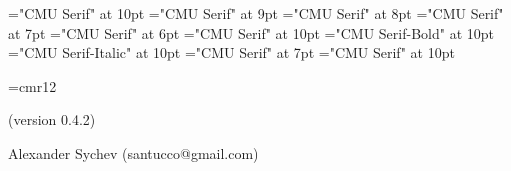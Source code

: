 \def\ver{0.4.2}
\font\tenrm="CMU Serif" at 10pt \tenrm
\font\ninerm="CMU Serif" at 9pt \ninerm
\font\eightrm="CMU Serif" at 8pt \eightrm 
\font\sevenrm="CMU Serif" at 7pt \sevenrm
\font\sixrm="CMU Serif" at 6pt \sixrm
\font\tentex="CMU Serif" at 10pt \tentex
\font\tenbf="CMU Serif-Bold" at 10pt \tenbf 
\font\tenit="CMU Serif-Italic" at 10pt \tenit 
\font\titlefont="CMU Serif" at 7pt   \titlefont 
\font\ttitlefont="CMU Serif" at 10pt  \ttitlefont

\def\As{\note{Также смотри секции}} %
\def\U{\note{Используется в секции}} %
\def\Us{\note{Используется в секциях}} %
\def\A{\note{Также смотри секцию}} %
\def\ET{ и~} %
\def\ETs{, и~} %
\def\fin{\par\vfill\eject %
  \ifpagesaved\null\vfill\eject\fi %
  \if L\lr\else\null\vfill\eject\fi %
  \parfillskip 0pt plus 1fil
  \def\grouptitle{НАЗВАНИЯ СЕКЦИЙ}
  \let\topsecno=\nullsec
  \message{Названия секций:}
  \output={\normaloutput\page\lheader\rheader}
  \setpage
  \def\note##1##2.{\quad{\eightrm##1~\ifacro{\pdfnote##2.}\else{##2}\fi.}}
  \def\Q{\note{Расположено в секции}} %
  \def\Qs{\note{Расположено в секциях}} %
  \def\U{\note{Используется в секции}} %
  \def\Us{\note{Используется в секциях}} %
  \def\I{\par\hangindent 2em}\let\*=*
  \def\outsecname{Названия секций}
  \ifacro \let\Xpdf\X
  \ifpdftex \makebookmarks \pdfdest name {NOS} fitb
    \pdfoutline goto name {NOS} count -\secno {\outsecname}
    \def\X##1:##2\X{\Xpdf##1:##2\X \firstsecno##1.%
      {\toksF={}\makeoutlinetoks##2\outlinedone\outlinedone}%
      \pdfoutline goto num \the\toksA \expandafter{\the\toksE}}
  \else\ifpdf
    \special{pdf: outline -1 << /Title (\outsecname)
      /Dest [ @thispage /FitH @ypos ] >>}
    \def\X##1:##2\X{\Xpdf##1:##2\X \firstsecno##1.%
      {\toksF={}\makeoutlinetoks##2\outlinedone\outlinedone}%
      \special{pdf: outline 0 << /Title (\the\toksE)
        /A << /S /GoTo /D (\romannumeral\the\toksA) >> >>}}
  \fi\fi\fi
  \readsections}


\font\authorfont=cmr12
 \titletrue\eject
\null\vfill
\centerline{\stitle}
\vskip 10pt\centerline{(version \ver)}
\vskip 24pt
\centerline{\authorfont Alexander Sychev (santucco@gmail.com)}
\vfill

